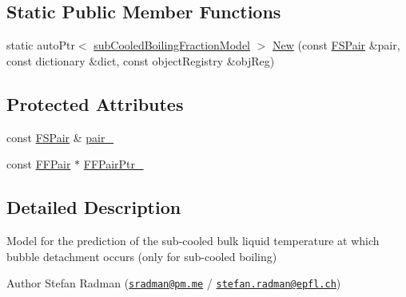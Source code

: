 \subsection*{Static Public Member Functions}
\begin{DoxyCompactItemize}
\item 
static auto\+Ptr$<$ \hyperlink{classFoam_1_1subCooledBoilingFractionModel}{sub\+Cooled\+Boiling\+Fraction\+Model} $>$ \hyperlink{classFoam_1_1subCooledBoilingFractionModel_a305ff3b42e0285ee3b072d30500afec0}{New} (const \hyperlink{classFoam_1_1FSPair}{F\+S\+Pair} \&pair, const dictionary \&dict, const object\+Registry \&obj\+Reg)
\end{DoxyCompactItemize}
\subsection*{Protected Attributes}
\begin{DoxyCompactItemize}
\item 
const \hyperlink{classFoam_1_1FSPair}{F\+S\+Pair} \& \hyperlink{classFoam_1_1subCooledBoilingFractionModel_a587e19a1b4f4b498d2604d20c093a73b}{pair\+\_\+}
\item 
const \hyperlink{classFoam_1_1FFPair}{F\+F\+Pair} $\ast$ \hyperlink{classFoam_1_1subCooledBoilingFractionModel_adca848d730733f4692fbd95dfea33c54}{F\+F\+Pair\+Ptr\+\_\+}
\end{DoxyCompactItemize}


\subsection{Detailed Description}
Model for the prediction of the sub-\/cooled bulk liquid temperature at which bubble detachment occurs (only for sub-\/cooled boiling) 

\label{_Description}%
 Author Stefan Radman (\href{mailto:sradman@pm.me}{\tt sradman@pm.\+me} / \href{mailto:stefan.radman@epfl.ch}{\tt stefan.\+radman@epfl.\+ch})

